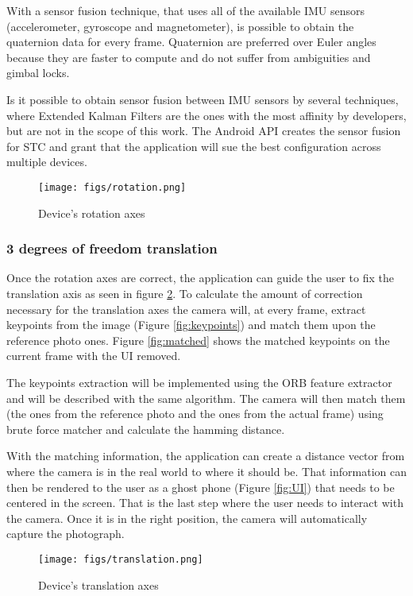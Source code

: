 \documentclass[12pt]{article}
\begin{document}
With a sensor fusion technique, that uses all of the available IMU sensors (accelerometer, gyroscope and magnetometer), is possible to obtain the quaternion data for every frame. Quaternion are preferred over Euler angles because they are faster to compute and do not suffer from ambiguities and gimbal locks.

Is it possible to obtain sensor fusion between IMU sensors by several techniques, where Extended Kalman Filters are the ones with the most affinity by developers, but are not in the scope of this work. The Android API creates the sensor fusion for STC and grant that the application will sue the best configuration across multiple devices.

\begin{figure}[ht]
\centering
\texttt{[image: figs/rotation.png]}
\caption{Device's rotation axes}
\label{fig:rotationAxes}    
\end{figure}

\subsubsection{3 degrees of freedom translation}
Once the rotation axes are correct, the application can guide the user to fix the translation axis as seen in figure \ref{fig:translationAxes}. To calculate the amount of correction necessary for the translation axes the camera will, at every frame, extract keypoints from the image (Figure \ref{fig:keypoints}) and match them upon the reference photo ones. Figure \ref{fig:matched} shows the matched keypoints on the current frame with the UI removed.

The keypoints extraction will be implemented using the ORB \cite{Rublee:11} feature extractor and will be described with the same algorithm. The camera will then match them (the ones from the reference photo and the ones from the actual frame) using brute force matcher and calculate the hamming distance. 

With the matching information, the application can create a distance vector from where the camera is in the real world to where it should be. That information can then be rendered to the user as a ghost phone (Figure \ref{fig:UI}) that needs to be centered in the screen. That is the last step where the user needs to interact with the camera. Once it is in the right position, the camera will automatically capture the photograph.

\begin{figure}[ht]
\centering
\texttt{[image: figs/translation.png]}
\caption{Device's translation axes}
\label{fig:translationAxes}    
\end{figure}
\end{document}
